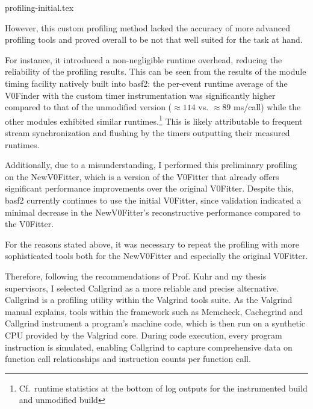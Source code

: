 \begin{table}[h]
  {profiling-initial.tex}
  \caption{Initial profiling results; method names are indented to reflect the call hierarchy}\label{tab:profiling-initial}
\end{table}

However, this custom profiling method lacked the accuracy of more advanced profiling tools and proved overall to be not that well suited for the task at hand.

For instance, it introduced a non-negligible runtime overhead, reducing the reliability of the profiling results.
This can be seen from the results of the module timing facility natively built into basf2: the per-event runtime average of the V0Finder with the custom timer instrumentation was significantly higher compared to that of the unmodified version ($\approx 114$ vs. $\approx 89$ \unit{\milli\second}/call) while the other modules exhibited similar runtimes.\footnote{%
  Cf.\ runtime statistics at the bottom of log outputs for the instrumented build  and unmodified build 
}
This is likely attributable to frequent stream synchronization and flushing by the timers outputting their measured runtimes.

Additionally, due to a misunderstanding, I performed this preliminary profiling on the NewV0Fitter, which is a version of the V0Fitter that already offers significant performance improvements over the original V0Fitter.
Despite this, basf2 currently continues to use the initial V0Fitter, since validation indicated a minimal decrease in the NewV0Fitter's reconstructive performance compared to the V0Fitter.

For the reasons stated above, it was necessary to repeat the profiling with more sophisticated tools both for the NewV0Fitter and especially the original V0Fitter.

Therefore, following the recommendations of Prof. Kuhr and my thesis supervisors, I selected Callgrind as a more reliable and precise alternative.
Callgrind \cite{callgrind-paper} is a profiling utility within the Valgrind \cite{valgrind-paper} tools suite.
As the Valgrind manual \cite{valgrind-manpage} explains, tools within the framework such as Memcheck, Cachegrind and Callgrind instrument a program's machine code, which is then run on a synthetic CPU provided by the Valgrind core.
During code execution, every program instruction is simulated, enabling Callgrind to capture comprehensive data on function call relationships and instruction counts per function call.

